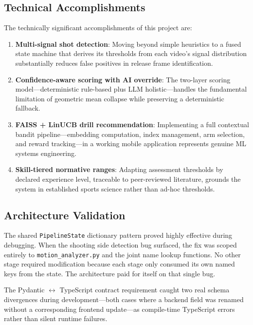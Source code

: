 \subsection{Technical Accomplishments}

The technically significant accomplishments of this project are:

\begin{enumerate}
  \item \textbf{Multi-signal shot detection}: Moving beyond simple heuristics to a fused state machine that derives its thresholds from each video's signal distribution substantially reduces false positives in release frame identification.
  \item \textbf{Confidence-aware scoring with AI override}: The two-layer scoring model---deterministic rule-based plus LLM holistic---handles the fundamental limitation of geometric mean collapse while preserving a deterministic fallback.
  \item \textbf{FAISS + LinUCB drill recommendation}: Implementing a full contextual bandit pipeline---embedding computation, index management, arm selection, and reward tracking---in a working mobile application represents genuine ML systems engineering.
  \item \textbf{Skill-tiered normative ranges}: Adapting assessment thresholds by declared experience level, traceable to peer-reviewed literature, grounds the system in established sports science rather than ad-hoc thresholds.
\end{enumerate}

\subsection{Architecture Validation}

The shared \lstinline|PipelineState| dictionary pattern proved highly effective during debugging. When the shooting side detection bug surfaced, the fix was scoped entirely to \lstinline|motion_analyzer.py| and the joint name lookup functions. No other stage required modification because each stage only consumed its own named keys from the state. The architecture paid for itself on that single bug.

The Pydantic $\leftrightarrow$ TypeScript contract requirement caught two real schema divergences during development---both cases where a backend field was renamed without a corresponding frontend update---as compile-time TypeScript errors rather than silent runtime failures.


